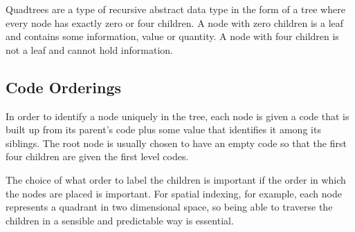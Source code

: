 Quadtrees are a type of recursive abstract data type in the form of a tree
where every node has exactly zero or four children. A node with zero children
is a leaf and contains some information, value or quantity. A node with four
children is not a leaf and cannot hold information.

\subsection{Code Orderings}
\label{sub:code_orderings}

In order to identify a node uniquely in the tree, each node is given a code
that is built up from its parent's code plus some value that identifies it
among its siblings. The root node is usually chosen to have an empty code so
that the first four children are given the first level codes.

The choice of what order to label the children is important if the order
in which the nodes are placed is important. For spatial indexing, for example,
each node represents a quadrant in two dimensional space, so being able to
traverse the children in a sensible and predictable way is essential.

